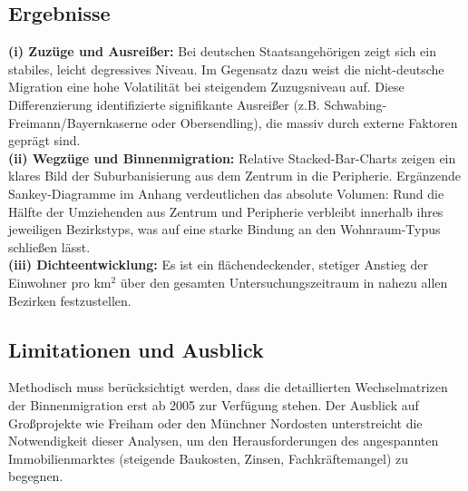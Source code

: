 \documentclass[11pt,a4paper]{article}
\begin{document}
\subsection*{Ergebnisse}

\textbf{(i) Zuzüge und Ausreißer:} Bei deutschen Staatsangehörigen zeigt sich ein stabiles, leicht degressives Niveau. Im Gegensatz dazu weist die nicht-deutsche Migration eine hohe Volatilität bei steigendem Zuzugsniveau auf. Diese Differenzierung identifizierte signifikante Ausreißer (z.B. Schwabing-Freimann/Bayernkaserne oder Obersendling), die massiv durch externe Faktoren geprägt sind. \vspace{0.4em} \\
\textbf{(ii) Wegzüge und Binnenmigration:} Relative Stacked-Bar-Charts zeigen ein klares Bild der Suburbanisierung aus dem Zentrum in die Peripherie. Ergänzende Sankey-Diagramme im Anhang verdeutlichen das absolute Volumen: Rund die Hälfte der Umziehenden aus Zentrum und Peripherie verbleibt innerhalb ihres jeweiligen Bezirkstyps, was auf eine starke Bindung an den Wohnraum-Typus schließen lässt. \vspace{0.4em} \\
\textbf{(iii) Dichteentwicklung:} Es ist ein flächendeckender, stetiger Anstieg der Einwohner pro km$^2$ über den gesamten Untersuchungszeitraum in nahezu allen Bezirken festzustellen.

\subsection*{Limitationen und Ausblick}

Methodisch muss berücksichtigt werden, dass die detaillierten Wechselmatrizen der Binnenmigration erst ab 2005 zur Verfügung stehen. Der Ausblick auf Großprojekte wie Freiham oder den Münchner Nordosten unterstreicht die Notwendigkeit dieser Analysen, um den Herausforderungen des angespannten Immobilienmarktes (steigende Baukosten, Zinsen, Fachkräftemangel) zu begegnen.
\end{document}
